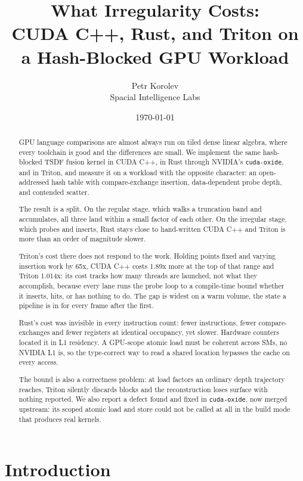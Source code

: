 \documentclass[11pt]{article}
\title{What Irregularity Costs:\\
CUDA C++, Rust, and Triton on a Hash-Blocked GPU Workload}
\author{Petr Korolev \\ Spacial Intelligence Labs}
\date{\today}
\begin{document}
\maketitle

\begin{abstract}
GPU language comparisons are almost always run on tiled dense linear algebra, where every toolchain is good and the differences are small. We implement the same hash-blocked TSDF fusion kernel in CUDA C++, in Rust through NVIDIA's \texttt{cuda-oxide}, and in Triton, and measure it on a workload with the opposite character: an open-addressed hash table with compare-exchange insertion, data-dependent probe depth, and contended scatter.

The result is a split. On the regular stage, which walks a truncation band and accumulates, all three land within a small factor of each other. On the irregular stage, which probes and inserts, Rust stays close to hand-written CUDA C++ and Triton is more than an order of magnitude slower.

Triton's cost there does not respond to the work. Holding points fixed and varying insertion work by 65x, CUDA C++ costs 1.89x more at the top of that range and Triton 1.014x: its cost tracks how many threads are launched, not what they accomplish, because every lane runs the probe loop to a compile-time bound whether it inserts, hits, or has nothing to do. The gap is widest on a warm volume, the state a pipeline is in for every frame after the first.

Rust's cost was invisible in every instruction count: fewer instructions, fewer compare-exchanges and fewer registers at identical occupancy, yet slower. Hardware counters located it in L1 residency. A GPU-scope atomic load must be coherent across SMs, no NVIDIA L1 is, so the type-correct way to read a shared location bypasses the cache on every access.

The bound is also a correctness problem: at load factors an ordinary depth trajectory reaches, Triton silently discards blocks and the reconstruction loses surface with nothing reported. We also report a defect found and fixed in \texttt{cuda-oxide}, now merged upstream: its scoped atomic load and store could not be called at all in the build mode that produces real kernels.
\end{abstract}

\section{Introduction}
\end{document}
